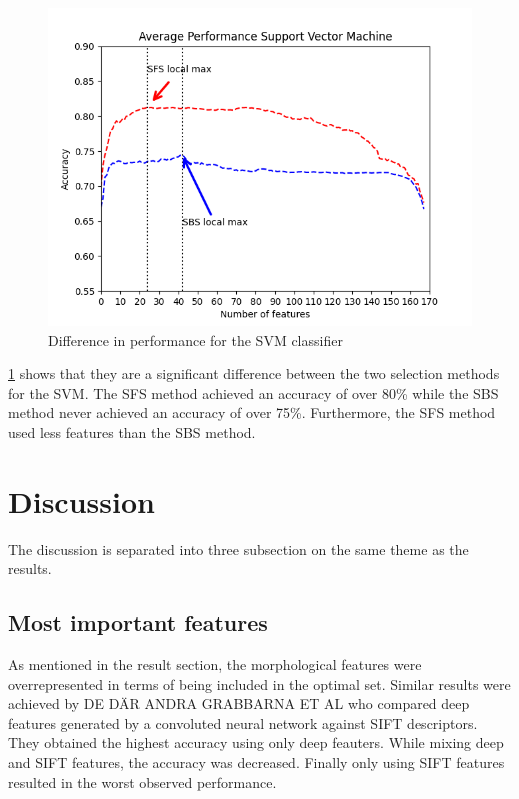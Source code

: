 \documentclass{kththesis}
\begin{document}
\begin{figure}[h!]
  \begin{center}
    \includegraphics[scale=0.8]{./figures/Figure_3.png}
    \caption{Difference in performance for the SVM classifier}
    \label{fig:svm}
  \end{center}
\end{figure}

\ref{fig:svm} shows that they are a significant difference between the two selection methods for the SVM. The SFS method achieved an accuracy of over 80\% while the SBS method never achieved an accuracy of over 75\%. Furthermore, the SFS method used less features than the SBS method.

\chapter{Discussion}

The discussion is separated into three subsection on the same theme as the results.

\section{Most important features}

As mentioned in the result section, the morphological features were overrepresented in terms of being included in the optimal set. Similar results were achieved by DE DÄR ANDRA GRABBARNA ET AL %
who compared deep features generated by a convoluted neural network against SIFT descriptors. They obtained the highest accuracy using only deep feauters. While mixing deep and SIFT features, the accuracy was decreased. Finally only using SIFT features resulted in the worst observed performance. 
\end{document}
